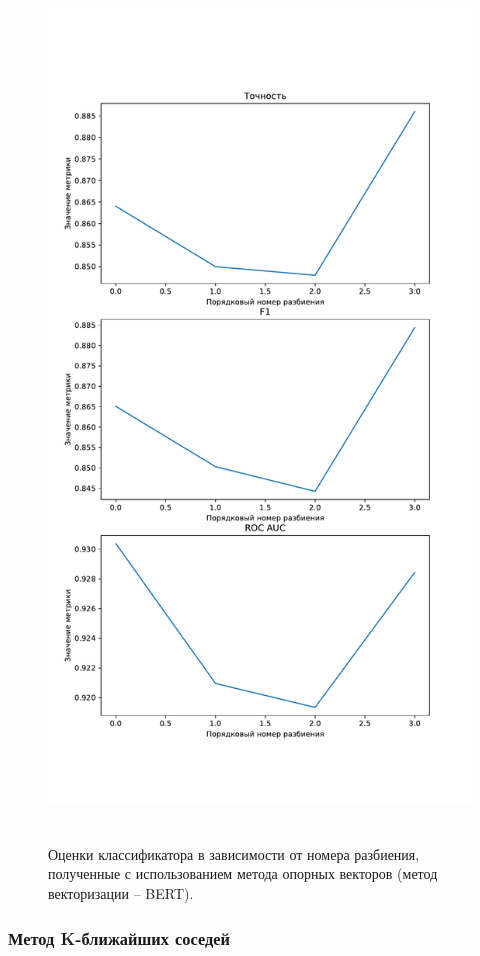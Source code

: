 \begin{figure}[H]
	\centering
	\includegraphics[height=23cm]{inc/plots/svcMetricsBert.pdf}
	\caption{ Оценки классификатора в зависимости от номера разбиения, полученные с использованием метода опорных векторов (метод векторизации -- BERT). }
	\label{img:svcMetricsBert}
\end{figure}



\subsubsection{Метод K-ближайших соседей }

